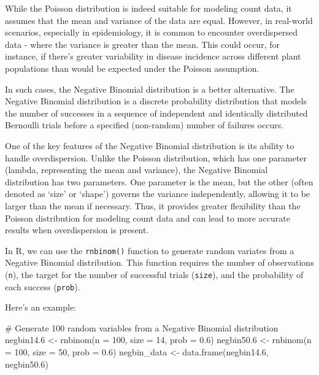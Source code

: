 \documentclass[
  letterpaper,
]{book}
\newenvironment{Shaded}{\begin{snugshade}}{\end{snugshade}}
\newcommand{\AttributeTok}[1]{\textcolor[rgb]{0.40,0.45,0.13}{#1}}
\newcommand{\CommentTok}[1]{\textcolor[rgb]{0.37,0.37,0.37}{#1}}
\newcommand{\DecValTok}[1]{\textcolor[rgb]{0.68,0.00,0.00}{#1}}
\newcommand{\FloatTok}[1]{\textcolor[rgb]{0.68,0.00,0.00}{#1}}
\newcommand{\FunctionTok}[1]{\textcolor[rgb]{0.28,0.35,0.67}{#1}}
\newcommand{\NormalTok}[1]{\textcolor[rgb]{0.00,0.23,0.31}{#1}}
\newcommand{\OtherTok}[1]{\textcolor[rgb]{0.00,0.23,0.31}{#1}}
\begin{document}
While the Poisson distribution is indeed suitable for modeling count
data, it assumes that the mean and variance of the data are equal.
However, in real-world scenarios, especially in epidemiology, it is
common to encounter overdispersed data - where the variance is greater
than the mean. This could occur, for instance, if there's greater
variability in disease incidence across different plant populations than
would be expected under the Poisson assumption.

In such cases, the Negative Binomial distribution is a better
alternative. The Negative Binomial distribution is a discrete
probability distribution that models the number of successes in a
sequence of independent and identically distributed Bernoulli trials
before a specified (non-random) number of failures occurs.

One of the key features of the Negative Binomial distribution is its
ability to handle overdispersion. Unlike the Poisson distribution, which
has one parameter (lambda, representing the mean and variance), the
Negative Binomial distribution has two parameters. One parameter is the
mean, but the other (often denoted as `size' or `shape') governs the
variance independently, allowing it to be larger than the mean if
necessary. Thus, it provides greater flexibility than the Poisson
distribution for modeling count data and can lead to more accurate
results when overdispersion is present.

In R, we can use the \texttt{rnbinom()} function to generate random
variates from a Negative Binomial distribution. This function requires
the number of observations (\texttt{n}), the target for the number of
successful trials (\texttt{size}), and the probability of each success
(\texttt{prob}).

Here's an example:

\begin{Shaded}
\begin{Highlighting}[]
\CommentTok{\# Generate 100 random variables from a Negative Binomial distribution}
\NormalTok{negbin14}\FloatTok{.6} \OtherTok{\textless{}{-}} \FunctionTok{rnbinom}\NormalTok{(}\AttributeTok{n =} \DecValTok{100}\NormalTok{, }\AttributeTok{size =} \DecValTok{14}\NormalTok{, }\AttributeTok{prob =} \FloatTok{0.6}\NormalTok{)}
\NormalTok{negbin50}\FloatTok{.6} \OtherTok{\textless{}{-}} \FunctionTok{rnbinom}\NormalTok{(}\AttributeTok{n =} \DecValTok{100}\NormalTok{, }\AttributeTok{size =} \DecValTok{50}\NormalTok{, }\AttributeTok{prob =} \FloatTok{0.6}\NormalTok{)}
\NormalTok{negbin\_data }\OtherTok{\textless{}{-}} \FunctionTok{data.frame}\NormalTok{(negbin14}\FloatTok{.6}\NormalTok{, negbin50}\FloatTok{.6}\NormalTok{)}
\end{Highlighting}
\end{Shaded}
\end{document}
